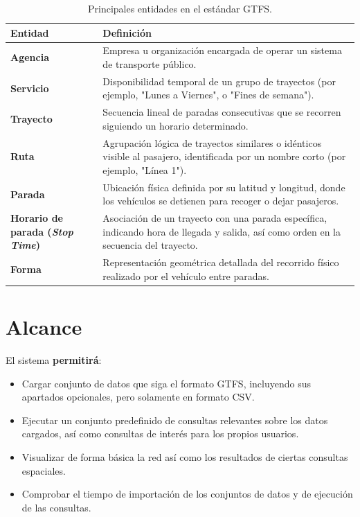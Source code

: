 \begin{table}[H]
    \centering
    \renewcommand{\arraystretch}{1.55}
    \begin{tabularx}{\textwidth}{p{3.8cm}X}
        \toprule
        \textbf{Entidad} & \textbf{Definición} \\
        \midrule
        \textbf{Agencia} & Empresa u organización encargada de operar un sistema de transporte público. \\
        \textbf{Servicio} & Disponibilidad temporal de un grupo de trayectos (por ejemplo, "Lunes a Viernes", o "Fines de semana"). \\
        \textbf{Trayecto} & Secuencia lineal de paradas consecutivas que se recorren siguiendo un horario determinado. \\
        \textbf{Ruta} & Agrupación lógica de trayectos similares o idénticos visible al pasajero, identificada por un nombre corto (por ejemplo, "Línea 1"). \\
        \textbf{Parada} & Ubicación física definida por su latitud y longitud, donde los vehículos se detienen para recoger o dejar pasajeros. \\
        \textbf{Horario de parada (\textit{Stop Time})} & Asociación de un trayecto con una parada específica, indicando hora de llegada y salida, así como orden en la secuencia del trayecto. \\
        \textbf{Forma} & Representación geométrica detallada del recorrido físico realizado por el vehículo entre paradas. \\
        \bottomrule
    \end{tabularx}
    \caption{Principales entidades en el estándar GTFS.}
    \label{requirements:entities}
\end{table}

\section{Alcance}

El sistema \textbf{permitirá}:
\begin{itemize}
    \item Cargar conjunto de datos que siga el formato GTFS, incluyendo sus apartados opcionales, pero solamente en formato CSV.
    \item Ejecutar un conjunto predefinido de consultas relevantes sobre los datos cargados, así como consultas de interés para los propios usuarios.
    \item Visualizar de forma básica la red así como los resultados de ciertas consultas espaciales.
    \item Comprobar el tiempo de importación de los conjuntos de datos y de ejecución de las consultas.
\end{itemize}

